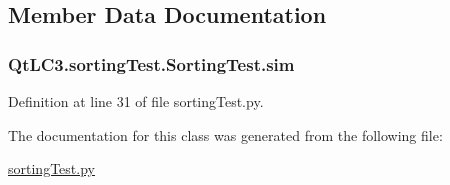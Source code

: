 \subsection{Member Data Documentation}
\hypertarget{class_qt_l_c3_1_1sorting_test_1_1_sorting_test_a7c42c3f120e66c3a19d29aa0e4afc9ec}{
\subsubsection[{sim}]{\setlength{\rightskip}{0pt plus 5cm}Qt\-L\-C3.\-sorting\-Test.\-Sorting\-Test.\-sim}}\label{class_qt_l_c3_1_1sorting_test_1_1_sorting_test_a7c42c3f120e66c3a19d29aa0e4afc9ec}


Definition at line 31 of file sorting\-Test.\-py.



The documentation for this class was generated from the following file\-:\begin{DoxyCompactItemize}
\item 
\hyperlink{sorting_test_8py}{sorting\-Test.\-py}\end{DoxyCompactItemize}

